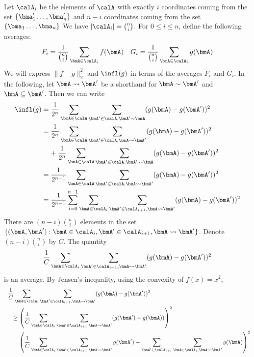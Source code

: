 Let $\calA_i$ be the elements of $\calA$ with exactly $i$ coordinates coming from the set 
$\{\bma_1' \ldots, \bma_n'\}$ 
and $n-i$ coordinates coming from the set 
$\{\bma_1 \ldots, \bma_n\}$
We have $|\calA_i| = \binom{n}{i}$. For $0 \leq i \leq n$, define the following averages:
\begin{align*}
    F_i = \frac{1}{\binom{n}{i}} \sum_{\bmA \in \calA_i} f(\bmA) & & 
    G_i = \frac{1}{\binom{n}{i}} \sum_{\bmA \in \calA_i} g(\bmA)
\end{align*}
We will express $\|f-g\|_2^2$ and $\infl(g)$ in terms of the averages $F_i$ and $G_i$. 
In the following, let $\bmA \leadsto \bmA'$ be a shorthand for $\bmA \sim \bmA'$
and $\bmA \subseteq \bmA'$. 
Then we can write
\begin{align}
    \infl(g) &= \frac{1}{2^n} \sum_{\bmA \in \calA} \sum_{\bmA' \in \calA, \bmA' \sim \bmA} (g(\bmA) - g(\bmA'))^2 \nonumber \\
    &= \frac{1}{2^n} \sum_{\bmA \in \calA} \sum_{\bmA' \in \calA, \bmA \leadsto
    \bmA'} (g(\bmA) - g(\bmA'))^2 \nonumber \\
    &\hspace{4mm} + \frac{1}{2^n} \sum_{\bmA \in \calA} \sum_{\bmA' \in \calA,
    \bmA' \leadsto \bmA} (g(\bmA) - g(\bmA'))^2 \nonumber \\
    &= \frac{1}{2^{n-1}} \sum_{\bmA \in \calA} \sum_{\bmA' \in \calA, \bmA \leadsto \bmA'} (g(\bmA) - g(\bmA'))^2  \nonumber \\
    &= \frac{1}{2^{n-1}} \sum_{i=0}^{n-1} \sum_{\bmA \in \calA_i} \sum_{\bmA' \in \calA_{i+1}, \bmA \leadsto \bmA'} (g(\bmA) - g(\bmA'))^2 \label{chap1-eq:infl-rep}
\end{align}
There are $(n-i)\binom{n}{i}$ elements in the set $\{(\bmA,\bmA') : \bmA \in \calA_i, \bmA' \in \calA_{i+1}, \bmA \leadsto \bmA'\}$. Denote $(n-i)\binom{n}{i}$ by $C$. 
The quantity
\begin{equation}\label{chap1-eq:infl-piece}
\frac{1}{C} \sum_{\bmA \in \calA_i} \sum_{\bmA' \in \calA_{i+1}, \bmA \leadsto \bmA'} (g(\bmA) - g(\bmA'))^2
\end{equation}
is an average. By Jensen's inequality, using the convexity of $f(x) = x^2$,
\begin{align}
    &\:~\frac{1}{C} \sum_{\bmA \in \calA_i} \sum_{\bmA' \in \calA_{i+1}, \bmA
    \leadsto \bmA'} (g(\bmA) - g(\bmA'))^2 \\
    &\:\hspace{1em}\geq \left( \frac{1}{C} \sum_{\bmA \in \calA_i} \sum_{\bmA'
  \in \calA_{i+1}, \bmA \leadsto \bmA'} (g(\bmA') - g(\bmA)) \right)^2 \nonumber \\
    &\:\hspace{1em} = \left( \frac{1}{C} \sum_{\bmA \in \calA_i} \sum_{\bmA' \in \calA_{i+1}, \bmA \leadsto \bmA'} g(\bmA') - \sum_{\bmA' \in \calA_{i+1}} \sum_{\bmA \in \calA_{i}, \bmA \leadsto \bmA'} g(\bmA) \right)^2 \label{chap1-eq:infl-jensen}
\end{align}
